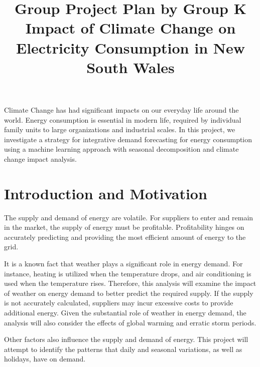 \documentclass[mstat,12pt]{unswthesis}
\title{Group Project Plan by Group K\\[0.5cm]Impact of Climate Change on
Electricity Consumption in New South Wales}
\author{\Authornameonly}
\begin{document}
\beforepreface


Climate Change has had significant impacts on our everyday life around
the world. Energy consumption is essential in modern life, required by
individual family units to large organizations and industrial scales. In
this project, we investigate a strategy for integrative demand
forecasting for energy consumption using a machine learning approach
with seasonal decomposition and climate change impact analysis.



\afterpreface





%
%






\setcounter{chapter}{1}
\renewcommand\thesection{\arabic{section}}

\hypertarget{introduction-and-motivation}{%
\section{Introduction and
Motivation}\label{introduction-and-motivation}}

The supply and demand of energy are volatile. For suppliers to enter and
remain in the market, the supply of energy must be profitable.
Profitability hinges on accurately predicting and providing the most
efficient amount of energy to the grid.

It is a known fact that weather plays a significant role in energy
demand. For instance, heating is utilized when the temperature drops,
and air conditioning is used when the temperature rises. Therefore, this
analysis will examine the impact of weather on energy demand to better
predict the required supply. If the supply is not accurately calculated,
suppliers may incur excessive costs to provide additional energy. Given
the substantial role of weather in energy demand, the analysis will also
consider the effects of global warming and erratic storm periods.

Other factors also influence the supply and demand of energy. This
project will attempt to identify the patterns that daily and seasonal
variations, as well as holidays, have on demand.
\end{document}
